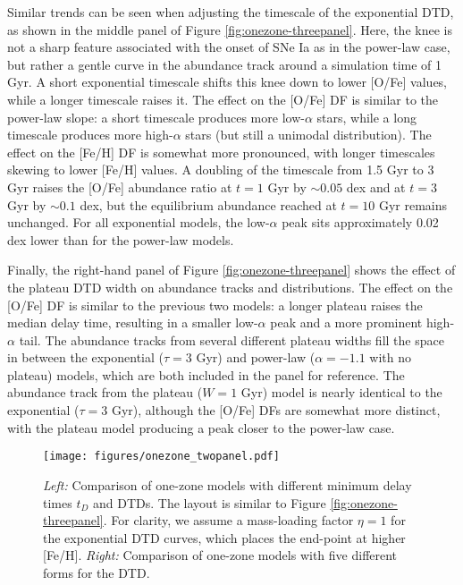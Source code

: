 \documentclass[twocolumn,twocolappendix,linenumbers,trackchanges]{aastex631}
\begin{document}
Similar trends can be seen when adjusting the timescale of the exponential DTD, as shown in the middle panel of Figure \ref{fig:onezone-threepanel}. Here, the knee is not a sharp feature associated with the onset of SNe Ia as in the power-law case, but rather a gentle curve in the abundance track around a simulation time of 1 Gyr. A short exponential timescale shifts this knee down to lower [O/Fe] values, while a longer timescale raises it. The effect on the [O/Fe] DF is similar to the power-law slope: a short timescale produces more low-$\alpha$ stars, while a long timescale produces more high-$\alpha$ stars (but still a unimodal distribution). The effect on the [Fe/H] DF is somewhat more pronounced, with longer timescales skewing to lower [Fe/H] values. A doubling of the timescale from 1.5 Gyr to 3 Gyr raises the [O/Fe] abundance ratio at $t=1$ Gyr by $\sim0.05$ dex and at $t=3$ Gyr by $\sim0.1$ dex, but the equilibrium abundance reached at $t=10$ Gyr remains unchanged. For all exponential models, the low-$\alpha$ peak sits approximately 0.02 dex lower than for the power-law models.

Finally, the right-hand panel of Figure \ref{fig:onezone-threepanel} shows the effect of the plateau DTD width on abundance tracks and distributions. The effect on the [O/Fe] DF is similar to the previous two models: a longer plateau raises the median delay time, resulting in a smaller low-$\alpha$ peak and a more prominent high-$\alpha$ tail. The abundance tracks from several different plateau widths fill the space in between the exponential ($\tau=3$ Gyr) and power-law ($\alpha=-1.1$ with no plateau) models, which are both included in the panel for reference. The abundance track from the plateau ($W=1$ Gyr) model is nearly identical to the exponential ($\tau=3$ Gyr), although the [O/Fe] DFs are somewhat more distinct, with the plateau model producing a peak closer to the power-law case.

\begin{figure*}
    \centering
    \texttt{[image: figures/onezone\_twopanel.pdf]}
    \caption{\textit{Left:} Comparison of one-zone models with different minimum delay times $t_D$ and DTDs.
    The layout is similar to Figure \ref{fig:onezone-threepanel}. For clarity, we assume a mass-loading factor $\eta=1$ for the exponential DTD curves, which places the end-point at higher [Fe/H].
    \textit{Right:} Comparison of one-zone models with five different forms for the DTD.
    }
    \label{fig:onezone-twopanel}
\end{figure*}
\end{document}
